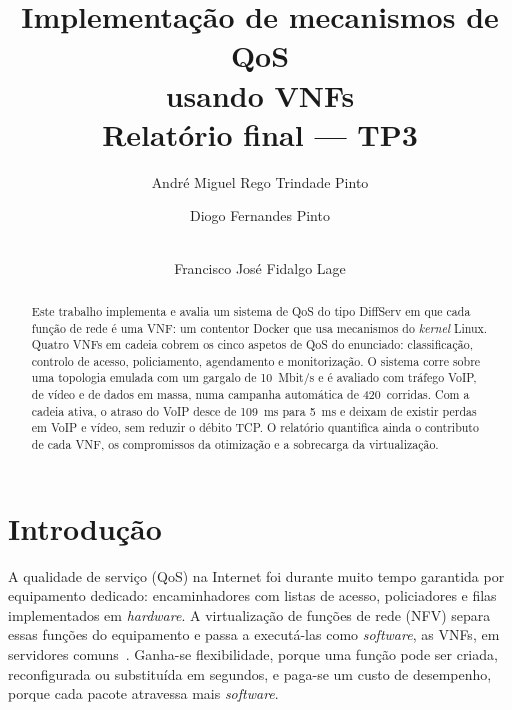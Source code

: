\documentclass[a4paper]{llncs}
\begin{document}
\title{Implementação de mecanismos de QoS\\ usando VNFs\\{\large Relatório final --- TP3}}

\author{André Miguel Rego Trindade Pinto \and Diogo Fernandes Pinto \and\\ Francisco José Fidalgo Lage}


\maketitle

\begin{abstract}
Este trabalho implementa e avalia um sistema de QoS do tipo DiffServ em que cada função
de rede é uma VNF: um contentor Docker que usa mecanismos do \emph{kernel} Linux.
Quatro VNFs em cadeia cobrem os cinco aspetos de QoS do enunciado: classificação,
controlo de acesso, policiamento, agendamento e monitorização. O sistema corre sobre
uma topologia emulada com um gargalo de 10~Mbit/s e é avaliado com tráfego VoIP, de
vídeo e de dados em massa, numa campanha automática de 420~corridas. Com a cadeia
ativa, o atraso do VoIP desce de 109~ms para 5~ms e deixam de existir perdas em VoIP e
vídeo, sem reduzir o débito TCP. O relatório quantifica ainda o contributo de
cada VNF, os compromissos da otimização e a sobrecarga da virtualização.
\end{abstract}

\section{Introdução}

A qualidade de serviço (QoS) na Internet foi durante muito tempo garantida por
equipamento dedicado: encaminhadores com listas de acesso, policiadores e filas
implementados em \emph{hardware}. A virtualização de funções de rede (NFV) separa
essas funções do equipamento e passa a executá-las como \emph{software}, as VNFs, em
servidores comuns~\cite{etsi-nfv}. Ganha-se flexibilidade, porque uma função pode ser
criada, reconfigurada ou substituída em segundos, e paga-se um custo de desempenho,
porque cada pacote atravessa mais \emph{software}.
\end{document}
